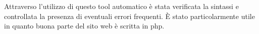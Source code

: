 Attraverso l'utilizzo di questo tool automatico è stata verificata la sintassi e controllata la presenza di eventuali errori frequenti. È stato particolarmente utile in quanto buona parte del sito web è scritta in php.